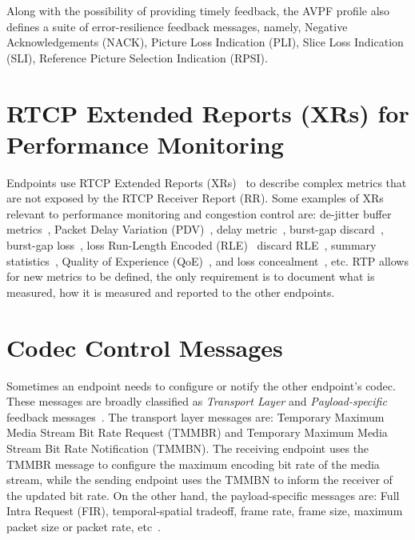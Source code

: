 Along with the possibility of providing timely feedback, the AVPF profile also
defines a suite of error-resilience feedback messages, namely, Negative
Acknowledgements (NACK), Picture Loss Indication (PLI), Slice Loss Indication
(SLI), Reference Picture Selection Indication (RPSI).

\section{RTCP Extended Reports (XRs) for Performance Monitoring}

Endpoints use RTCP Extended Reports (XRs)~\cite{rfc3611} to describe complex
metrics that are not exposed by the RTCP Receiver Report (RR). Some examples
of XRs relevant to performance monitoring and congestion control are:
de-jitter buffer metrics~\cite{draft.xr.jb}, Packet Delay Variation
(PDV)~\cite{rfc6798}, delay metric~\cite{rfc6843}, burst-gap discard~\cite{
draft.xr.bg.discard}, burst-gap loss~\cite{rfc6958}, loss Run-Length Encoded
(RLE)~\cite{rfc3611} discard RLE~\cite{draft.xr.discard.rle}, summary
statistics~\cite{draft.xr.stat}, Quality of Experience
(QoE)~\cite{draft.xr.qoe}, and loss concealment~\cite{draft.xr.conceal}, etc.
RTP allows for new metrics to be defined, the only requirement is to document
what is measured, how it is measured and reported to the other endpoints.




\section{Codec Control Messages}

Sometimes an endpoint needs to configure or notify the other endpoint's codec.
These messages are broadly classified as \emph{Transport Layer} and \emph
{Payload-specific} feedback messages~\cite{rfc5104}. The transport layer
messages are: Temporary Maximum Media Stream Bit Rate Request (TMMBR) and
Temporary Maximum Media Stream Bit Rate Notification (TMMBN). The receiving
endpoint uses the TMMBR message to configure the maximum encoding bit rate of
the media stream, while the sending endpoint uses the TMMBN to inform the
receiver of the updated bit rate. On the other hand, the payload-specific
messages are: Full Intra Request (FIR), temporal-spatial tradeoff, frame
rate, frame size, maximum packet size or packet rate,
etc~\cite{draft.avt.cop}.


